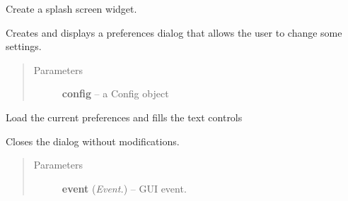 \documentclass[letterpaper,10pt,english]{sphinxmanual}
\begin{document}

\begin{fulllineitems}
\label{api:wos.MySplashScreen}
Create a splash screen widget.

\end{fulllineitems}


\begin{fulllineitems}
\label{api:wos.PreferencesDialog}
Creates and displays a preferences dialog that allows the user to change some settings.
\begin{quote}\begin{description}
\item[{Parameters}] \leavevmode
\textbf{config} -- a Config object

\end{description}\end{quote}

\begin{fulllineitems}
\label{api:wos.PreferencesDialog.loadPreferences}
Load the current preferences and fills the text controls

\end{fulllineitems}


\begin{fulllineitems}
\label{api:wos.PreferencesDialog.onCancel}
Closes the dialog without modifications.
\begin{quote}\begin{description}
\item[{Parameters}] \leavevmode
\textbf{event} (\emph{Event.}) -- GUI event.

\end{description}\end{quote}

\end{fulllineitems}



\end{fulllineitems}
\end{document}
